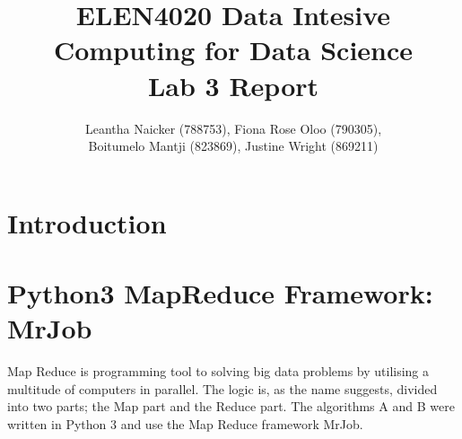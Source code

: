 \documentclass[10pt,a4paper]{article}
\title{\textbf{ELEN4020 Data Intesive Computing for Data Science\\Lab 3 Report}}
\author{Leantha Naicker (788753), Fiona Rose Oloo (790305),\\Boitumelo Mantji (823869), Justine Wright (869211)}
\affil{The University of Witwatersrand}
\begin{document}
\maketitle

\section{Introduction}
\noindent

\section{Python3 MapReduce Framework: MrJob}
\noindent Map Reduce is programming tool to solving big data problems by utilising a multitude of computers in parallel. The logic is, as the name suggests, divided into two parts; the Map part and the Reduce part.
The algorithms A and B were written in Python 3 and use the Map Reduce framework MrJob.
\end{document}

